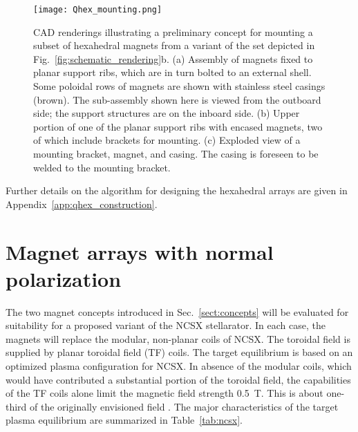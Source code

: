 \documentclass[11pt,onecolumn]{article}
\begin{document}
\begin{figure}
    \begin{center}
    \texttt{[image: Qhex\_mounting.png]}
    \caption{CAD renderings illustrating a preliminary concept for mounting
             a subset of hexahedral magnets from a variant of the 
             set depicted in Fig.~\ref{fig:schematic_rendering}b. 
             (a) Assembly of magnets fixed to planar support ribs, which are
                 in turn bolted to an external shell. Some poloidal rows of 
                 magnets are shown with stainless steel casings (brown). The 
                 sub-assembly shown here is viewed from the outboard side; 
                 the support structures are on the inboard side.
             (b) Upper portion of one of the planar support ribs with 
                 encased magnets, two of which include brackets for mounting.
             (c) Exploded view of a mounting bracket, magnet, and casing.
                 The casing is foreseen to be welded to the mounting bracket. }
    \label{fig:sas_ribs}
    \end{center}
\end{figure}

Further details on the algorithm for designing the hexahedral arrays are 
given in Appendix~\ref{app:qhex_construction}.

\section{Magnet arrays with normal polarization}
\label{sect:perp_axis}

The two magnet concepts introduced in Sec.~\ref{sect:concepts} will be 
evaluated for suitability for a proposed variant of the NCSX stellarator.
In each case, the magnets will replace the modular, non-planar coils of NCSX.
The toroidal field is supplied by planar toroidal field (TF) coils. 
The target equilibrium is based on an optimized plasma configuration for NCSX.
In absence of the modular coils, which would have contributed a substantial
portion of the toroidal field, the capabilities of the TF coils alone limit
the magnetic field strength 0.5~T. This is about one-third of 
the originally envisioned field \cite{zarnstorff2001a}.
The major characteristics of the target 
plasma equilibrium are summarized in Table~\ref{tab:ncsx}.
\end{document}
